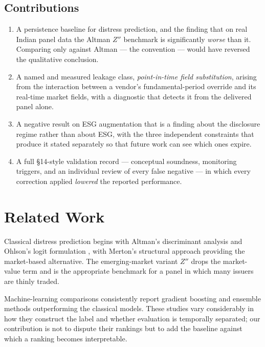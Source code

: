 \documentclass[conference]{IEEEtran}
\begin{document}
\subsection{Contributions}
\begin{enumerate}
\item A persistence baseline for distress prediction, and the finding that on
      real Indian panel data the Altman $Z''$ benchmark is significantly
      \emph{worse} than it. Comparing only against Altman --- the convention
      --- would have reversed the qualitative conclusion.
\item A named and measured leakage class, \emph{point-in-time field
      substitution}, arising from the interaction between a vendor's
      fundamental-period override and its real-time market fields, with a
      diagnostic that detects it from the delivered panel alone.
\item A negative result on ESG augmentation that is a finding about the
      disclosure regime rather than about ESG, with the three independent
      constraints that produce it stated separately so that future work can
      see which ones expire.
\item A full §14-style validation record --- conceptual soundness, monitoring
      triggers, and an individual review of every false negative --- in which
      every correction applied \emph{lowered} the reported performance.
\end{enumerate}

\section{Related Work}

Classical distress prediction begins with Altman's discriminant analysis
\cite{altman1968} and Ohlson's logit formulation \cite{ohlson1980}, with
Merton's structural approach \cite{merton1974} providing the market-based
alternative. The emerging-market variant $Z''$ \cite{altman1968} drops the
market-value term and is the appropriate benchmark for a panel in which many
issuers are thinly traded.

Machine-learning comparisons \cite{lessmann2015,barboza2017,jones2017}
consistently report gradient boosting and ensemble methods outperforming the
classical models. These studies vary considerably in how they construct the
label and whether evaluation is temporally separated; our contribution is not
to dispute their rankings but to add the baseline against which a ranking
becomes interpretable.
\end{document}
